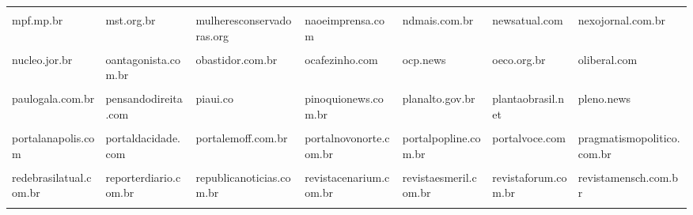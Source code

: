 \begin{longtable}[t]{lllllll}
\addlinespace
\cellcolor{gray!10}{metropoles.com} & \cellcolor{gray!10}{metroworldnews.com.br} & \cellcolor{gray!10}{midianews.com.br} & \cellcolor{gray!10}{midianinja.org} & \cellcolor{gray!10}{migalhas.com.br} & \cellcolor{gray!10}{moneytimes.com.br} & \cellcolor{gray!10}{movimentosempicanha.com.br}\\
mpf.mp.br & mst.org.br & mulheresconservadoras.org & naoeimprensa.com & ndmais.com.br & newsatual.com & nexojornal.com.br\\
\cellcolor{gray!10}{noataque.com.br} & \cellcolor{gray!10}{nopontodofato.com} & \cellcolor{gray!10}{noticiabrasil.net.br} & \cellcolor{gray!10}{noticiasaominuto.com} & \cellcolor{gray!10}{noticiasaominuto.com.br} & \cellcolor{gray!10}{novonoticias.com.br} & \cellcolor{gray!10}{nsctotal.com.br}\\
nucleo.jor.br & oantagonista.com.br & obastidor.com.br & ocafezinho.com & ocp.news & oeco.org.br & oliberal.com\\
\cellcolor{gray!10}{opopular.com.br} & \cellcolor{gray!10}{opovo.com.br} & \cellcolor{gray!10}{orepublicano.com.br} & \cellcolor{gray!10}{otempo.com.br} & \cellcolor{gray!10}{outraspalavras.net} & \cellcolor{gray!10}{paraibaonline.com.br} & \cellcolor{gray!10}{paulofigueiredoshow.com}\\
\addlinespace
paulogala.com.br & pensandodireita.com & piaui.co & pinoquionews.com.br & planalto.gov.br & plantaobrasil.net & pleno.news\\
\cellcolor{gray!10}{plural.jor.br} & \cellcolor{gray!10}{poa24horas.com.br} & \cellcolor{gray!10}{poder360.com.br} & \cellcolor{gray!10}{politicalivre.com.br} & \cellcolor{gray!10}{politicos.org.br} & \cellcolor{gray!10}{ponte.org} & \cellcolor{gray!10}{portalamazonia.com}\\
portalanapolis.com & portaldacidade.com & portalemoff.com.br & portalnovonorte.com.br & portalpopline.com.br & portalvoce.com & pragmatismopolitico.com.br\\
\cellcolor{gray!10}{pt.org.br} & \cellcolor{gray!10}{ptnacamara.org.br} & \cellcolor{gray!10}{ptsaopaulo.org.br} & \cellcolor{gray!10}{publica.org.br} & \cellcolor{gray!10}{r7.com} & \cellcolor{gray!10}{radio93.com.br} & \cellcolor{gray!10}{radiopeaobrasil.com.br}\\
redebrasilatual.com.br & reporterdiario.com.br & republicanoticias.com.br & revistacenarium.com.br & revistaesmeril.com.br & revistaforum.com.br & revistamensch.com.br\\
\addlinespace
\cellcolor{gray!10}{revistaoeste.com} & \cellcolor{gray!10}{revistaonline.news} & \cellcolor{gray!10}{ric.com.br} & \cellcolor{gray!10}{rothbardbrasil.com} & \cellcolor{gray!10}{rtbrasil.com} & \cellcolor{gray!10}{saibamais.jor.br} & \cellcolor{gray!10}{samiabomfim.com.br}\\

\end{longtable}
